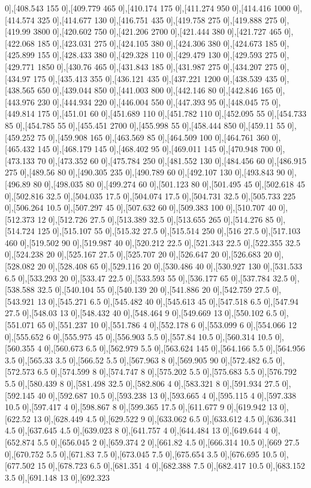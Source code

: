 {0],[408.543 155 0],[409.779 465 0],[410.174 175 0],[411.274 950 0],[414.416 1000 0],[414.574 325 0],[414.677 130 0],[416.751 435 0],[419.758 275 0],[419.888 275 0],[419.99 3800 0],[420.602 750 0],[421.206 2700 0],[421.444 380 0],[421.727 465 0],[422.068 185 0],[423.031 275 0],[424.105 380 0],[424.306 380 0],[424.673 185 0],[425.899 155 0],[428.433 380 0],[429.328 110 0],[429.479 130 0],[429.593 275 0],[429.771 1850 0],[430.76 465 0],[431.843 185 0],[431.987 275 0],[434.207 275 0],[434.97 175 0],[435.413 355 0],[436.121 435 0],[437.221 1200 0],[438.539 435 0],[438.565 650 0],[439.044 850 0],[441.003 800 0],[442.146 80 0],[442.846 165 0],[443.976 230 0],[444.934 220 0],[446.004 550 0],[447.393 95 0],[448.045 75 0],[449.814 175 0],[451.01 60 0],[451.689 110 0],[451.782 110 0],[452.095 55 0],[454.733 85 0],[454.785 55 0],[455.451 2700 0],[455.998 55 0],[458.444 850 0],[459.11 55 0],[459.252 75 0],[459.908 165 0],[463.569 85 0],[464.509 100 0],[464.761 360 0],[465.432 145 0],[468.179 145 0],[468.402 95 0],[469.011 145 0],[470.948 700 0],[473.133 70 0],[473.352 60 0],[475.784 250 0],[481.552 130 0],[484.456 60 0],[486.915 275 0],[489.56 80 0],[490.305 235 0],[490.789 60 0],[492.107 130 0],[493.843 90 0],[496.89 80 0],[498.035 80 0],[499.274 60 0],[501.123 80 0],[501.495 45 0],[502.618 45 0],[502.816 32.5 0],[504.035 17.5 0],[504.074 17.5 0],[504.731 32.5 0],[505.733 225 0],[506.264 10.5 0],[507.297 45 0],[507.632 60 0],[509.383 100 0],[510.707 40 0],[512.373 12 0],[512.726 27.5 0],[513.389 32.5 0],[513.655 265 0],[514.276 85 0],[514.724 125 0],[515.107 55 0],[515.32 27.5 0],[515.514 250 0],[516 27.5 0],[517.103 460 0],[519.502 90 0],[519.987 40 0],[520.212 22.5 0],[521.343 22.5 0],[522.355 32.5 0],[524.238 20 0],[525.167 27.5 0],[525.707 20 0],[526.647 20 0],[526.683 20 0],[528.082 20 0],[528.408 65 0],[529.116 20 0],[530.486 40 0],[530.927 130 0],[531.533 6.5 0],[533.293 20 0],[533.47 22.5 0],[533.593 55 0],[536.177 65 0],[537.784 32.5 0],[538.588 32.5 0],[540.104 55 0],[540.139 20 0],[541.886 20 0],[542.759 27.5 0],[543.921 13 0],[545.271 6.5 0],[545.482 40 0],[545.613 45 0],[547.518 6.5 0],[547.94 27.5 0],[548.03 13 0],[548.432 40 0],[548.464 9 0],[549.669 13 0],[550.102 6.5 0],[551.071 65 0],[551.237 10 0],[551.786 4 0],[552.178 6 0],[553.099 6 0],[554.066 12 0],[555.652 6 0],[555.975 45 0],[556.903 5.5 0],[557.84 10.5 0],[560.314 10.5 0],[560.355 4 0],[560.673 6.5 0],[562.979 5.5 0],[563.624 145 0],[564.166 5.5 0],[564.956 3.5 0],[565.33 3.5 0],[566.52 5.5 0],[567.963 8 0],[569.905 90 0],[572.482 6.5 0],[572.573 6.5 0],[574.599 8 0],[574.747 8 0],[575.202 5.5 0],[575.683 5.5 0],[576.792 5.5 0],[580.439 8 0],[581.498 32.5 0],[582.806 4 0],[583.321 8 0],[591.934 27.5 0],[592.145 40 0],[592.687 10.5 0],[593.238 13 0],[593.665 4 0],[595.115 4 0],[597.338 10.5 0],[597.417 4 0],[598.867 8 0],[599.365 17.5 0],[611.677 9 0],[619.942 13 0],[622.52 13 0],[628.449 4.5 0],[629.522 9 0],[633.062 6.5 0],[633.612 4.5 0],[636.341 4.5 0],[637.645 4.5 0],[639.023 8 0],[641.757 4 0],[644.484 13 0],[649.644 4 0],[652.874 5.5 0],[656.045 2 0],[659.374 2 0],[661.82 4.5 0],[666.314 10.5 0],[669 27.5 0],[670.752 5.5 0],[671.83 7.5 0],[673.045 7.5 0],[675.654 3.5 0],[676.695 10.5 0],[677.502 15 0],[678.723 6.5 0],[681.351 4 0],[682.388 7.5 0],[682.417 10.5 0],[683.152 3.5 0],[691.148 13 0],[692.323 }
